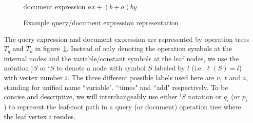 \begin{figure}
\begin{minipage}[b]{2.65in}
\begin{center}
{
} 
\\[5mm]
document expression $ax + (b+a)by$
\end{center}
\end{minipage}
\caption{Example query/document expression representation}\label{expGraph}
\end{figure}

The query expression and document expression are represented by operation trees $T_q$ and $T_d$ in figure~\ref{expGraph}. 
Instead of only denoting the operation symbols at the internal nodes and the variable/constant symbols at the leaf nodes, we use the notation $^i_l S$ or $^i S$ to denote a node with symbol $S$ labeled by $l$ (i.e. $\ell(S)=l$) with vertex number $i$. 
The three different possible labels used here are $v,\ t$ and $a$, standing for unified name ``variable", ``times" and ``add" respectively.
To be concise and descriptive, we will interchangeably use either $^i S$ notation or $q_i$ (or $p_i$) to represent the leaf-root path in a query (or document) operation tree where the leaf vertex $i$ resides.

